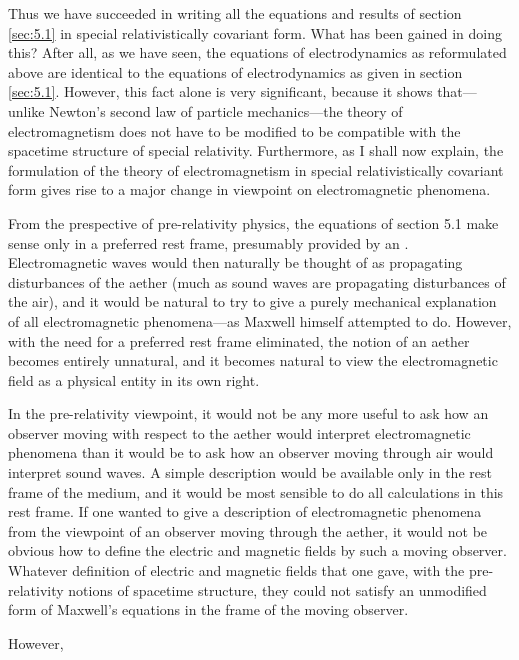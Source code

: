 Thus we have succeeded in writing all the equations and results of section \ref{sec:5.1} in special relativistically covariant form. What has been gained in doing this? After all, as we have seen, the equations of electrodynamics as reformulated above are identical to the equations of electrodynamics as given in section \ref{sec:5.1}. However, this fact alone is very significant, because it shows that---unlike Newton's second law of particle mechanics---the theory of electromagnetism does not have to be modified to be compatible with the spacetime structure of special relativity. Furthermore, as I shall now explain, the formulation of the theory of electromagnetism in special relativistically covariant form gives rise to a major change in viewpoint on electromagnetic phenomena. 

From the prespective of pre-relativity physics, the equations of section 5.1 make sense only in a preferred rest frame, presumably provided by an . Electromagnetic waves would then naturally be thought of as propagating disturbances of the aether (much as sound waves are propagating disturbances of the air), and it would be natural to try to give a purely mechanical explanation of all electromagnetic phenomena---as Maxwell himself attempted to do. However, with the need for a preferred rest frame eliminated, the notion of an aether becomes entirely unnatural, and it becomes natural to view the electromagnetic field as a physical entity in its own right.

In the pre-relativity viewpoint, it would not be any more useful to ask how an observer moving with respect to the aether would interpret electromagnetic phenomena than it would be to ask how an observer moving through air would interpret sound waves. A simple description would be available only in the rest frame of the medium, and it would be most sensible to do all calculations in this rest frame. If one wanted to give a description of electromagnetic phenomena from the viewpoint of an observer moving through the aether, it would not be obvious how to define the electric and magnetic fields  by such a moving observer. Whatever definition of electric and magnetic fields that one gave, with the pre-relativity notions of spacetime structure, they could not satisfy an unmodified form of Maxwell's equations in the frame of the moving observer. 

However,  









